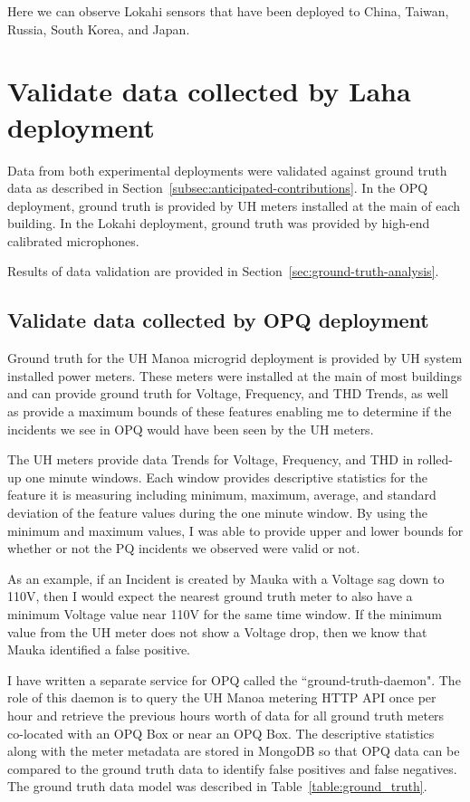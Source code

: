 Here we can observe Lokahi sensors that have been deployed to China, Taiwan, Russia, South Korea, and Japan.

\section{Validate data collected by Laha deployment}\label{sec:validate-data-collected-by-laha-deployment}
Data from both experimental deployments were validated against ground truth data as described in Section~\ref{subsec:anticipated-contributions}. In the OPQ deployment, ground truth is provided by UH meters installed at the main of each building. In the Lokahi deployment, ground truth was provided by high-end calibrated microphones.

Results of data validation are provided in Section~\ref{sec:ground-truth-analysis}.

\subsection{Validate data collected by OPQ deployment}\label{subsec:validate-data-collected-by-opq-deployment}

Ground truth for the UH Manoa microgrid deployment is provided by UH system installed power meters. These meters were installed at the main of most buildings and can provide ground truth for Voltage, Frequency, and THD Trends, as well as provide a maximum bounds of these features enabling me to determine if the incidents we see in OPQ would have been seen by the UH meters.

The UH meters provide data Trends for Voltage, Frequency, and THD in rolled-up one minute windows. Each window provides descriptive statistics for the feature it is measuring including minimum, maximum, average, and standard deviation of the feature values during the one minute window. By using the minimum and maximum values, I was able to provide upper and lower bounds for whether or not the PQ incidents we observed were valid or not.

As an example, if an Incident is created by Mauka with a Voltage sag down to 110V, then I would expect the nearest ground truth meter to also have a minimum Voltage value near 110V for the same time window. If the minimum value from the UH meter does not show a Voltage drop, then we know that Mauka identified a false positive.

I have written a separate service for OPQ called the ``ground-truth-daemon". The role of this daemon is to query the UH Manoa metering HTTP API once per hour and retrieve the previous hours worth of data for all ground truth meters co-located with an OPQ Box or near an OPQ Box. The descriptive statistics along with the meter metadata are stored in MongoDB so that OPQ data can be compared to the ground truth data to identify false positives and false negatives. The ground truth data model was described in Table~\ref{table:ground_truth}.

